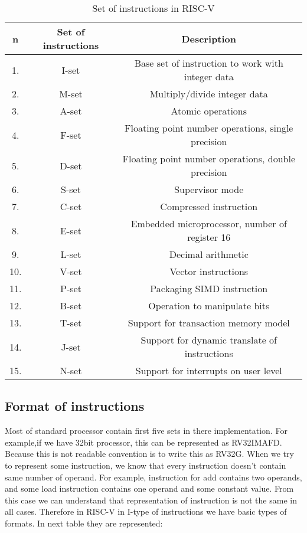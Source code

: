 \documentclass{scrreprt}
\begin{document}
    \begin{table}[ht]
        \centering
        \begin{tabular}{|c|c|c|} \hline 
             n & Set of instructions & Description \\ \hline 
             1. &  I-set & Base set of instruction to work with integer data \\ \hline 
             2. &  M-set & Multiply/divide integer data \\ \hline 
             3. &  A-set &  Atomic operations \\ \hline 
             4. &  F-set &   Floating point number operations, single precision\\ \hline 
             5. &  D-set &  Floating point number operations, double precision\\ \hline 
             6. &  S-set &  Supervisor mode\\ \hline 
             7. &  C-set &  Compressed instruction \\ \hline 
             8. &  E-set &  Embedded microprocessor, number of register 16 \\\hline 
             9. &  L-set &   Decimal arithmetic \\ \hline 
             10. &  V-set &  Vector instructions \\ \hline 
             11. &  P-set &  Packaging SIMD instruction\\ \hline 
             12. &  B-set &  Operation to manipulate bits \\ \hline 
             13. &  T-set &  Support for transaction memory model \\\hline 
             14. &  J-set &  Support for dynamic translate of instructions \\ \hline 
             15. &  N-set &  Support for interrupts on user level  \\\hline 
             
        \end{tabular}
        \caption{Set of instructions in RISC-V}
        \label{tab:table1}
    \end{table}
    \subsection*{Format of instructions}
        Most of standard processor contain first five sets in there implementation. For example,if we have 32bit processor, this can be represented as RV32IMAFD. Because this is not readable convention is to write this as RV32G. 
        When we try to represent some instruction, we know that every instruction doesn't contain same number of operand. For example, instruction for add contains two operands, and some load instruction contains one operand and some constant value. From this case we can understand that representation of instruction is not the same in all cases. Therefore in RISC-V in I-type of instructions we have basic types of formats. In next table they are represented:
    
\end{document}
